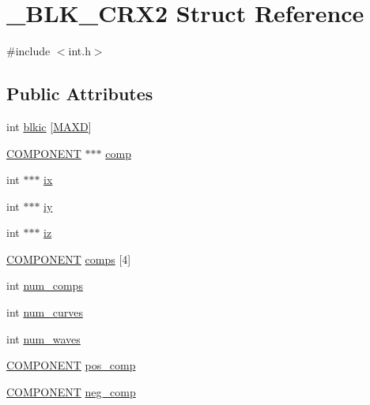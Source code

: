 \hypertarget{struct___b_l_k___c_r_x2}{}\section{\+\_\+\+B\+L\+K\+\_\+\+C\+R\+X2 Struct Reference}
\label{struct___b_l_k___c_r_x2}


{\ttfamily \#include $<$int.\+h$>$}

\subsection*{Public Attributes}
\begin{DoxyCompactItemize}
\item 
int \hyperlink{struct___b_l_k___c_r_x2_aca901bde96e51ecfe4e7408ee4299889}{blkic} \mbox{[}\hyperlink{geom_8h_aabfcbcb5ac86a1edac4035264bc7d2b8ac79558c6c6666a44ddf7e701241b8211}{M\+A\+XD}\mbox{]}
\item 
\hyperlink{int_8h_a2bb7be12ca59ea6443c8757df0a7c278}{C\+O\+M\+P\+O\+N\+E\+NT} $\ast$$\ast$$\ast$ \hyperlink{struct___b_l_k___c_r_x2_a21a70f27a2c277fcb4c60fe1a3cb1a9a}{comp}
\item 
int $\ast$$\ast$$\ast$ \hyperlink{struct___b_l_k___c_r_x2_a0f4a2334b609d5e5281236af0f671a80}{ix}
\item 
int $\ast$$\ast$$\ast$ \hyperlink{struct___b_l_k___c_r_x2_af6e690e3486f02a1363a52e9be96a897}{iy}
\item 
int $\ast$$\ast$$\ast$ \hyperlink{struct___b_l_k___c_r_x2_a692ee9c769fd69dfbb4f07ae2a5d2f1e}{iz}
\item 
\hyperlink{int_8h_a2bb7be12ca59ea6443c8757df0a7c278}{C\+O\+M\+P\+O\+N\+E\+NT} \hyperlink{struct___b_l_k___c_r_x2_a242c12d10a7e6853a29ecfa3bc5cfdbb}{comps} \mbox{[}4\mbox{]}
\item 
int \hyperlink{struct___b_l_k___c_r_x2_a22fb991f94d0395af03f0d86077edaa6}{num\+\_\+comps}
\item 
int \hyperlink{struct___b_l_k___c_r_x2_a47c8af6c85a9d934278fc1cd8d92ce83}{num\+\_\+curves}
\item 
int \hyperlink{struct___b_l_k___c_r_x2_a316dd4d0a552abd5b801fbdb91bc928c}{num\+\_\+waves}
\item 
\hyperlink{int_8h_a2bb7be12ca59ea6443c8757df0a7c278}{C\+O\+M\+P\+O\+N\+E\+NT} \hyperlink{struct___b_l_k___c_r_x2_a925abab47fb42fddbf29ddeeb33392a4}{pos\+\_\+comp}
\item 
\hyperlink{int_8h_a2bb7be12ca59ea6443c8757df0a7c278}{C\+O\+M\+P\+O\+N\+E\+NT} \hyperlink{struct___b_l_k___c_r_x2_aad0971a535667b196be76f048b91936e}{neg\+\_\+comp}

\end{DoxyCompactItemize}
